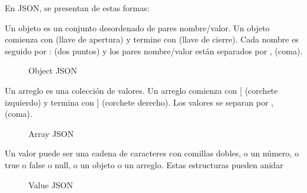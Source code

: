 En JSON, se presentan de estas formas:


Un objeto es un conjunto desordenado de pares nombre/valor. Un objeto comienza con { (llave de apertura) y termine con } (llave de cierre). Cada nombre es seguido por : (dos puntos) y los pares nombre/valor están separados por , (coma).
\begin{figure}[H]
\centering
{}
\caption{Object JSON} \label{fig:objectJSON}
\end{figure}

Un arreglo es una colecci\'on de valores. Un arreglo comienza con [ (corchete izquierdo) y termina con ] (corchete derecho). Los valores se separan por , (coma).

\begin{figure}[H]
\centering
{}
\caption{Array JSON} \label{fig:arrayJSON}
\end{figure}

Un valor puede ser una cadena de caracteres con comillas dobles, o un n\'umero, o true o false o null, o un objeto o un arreglo. Estas estructuras pueden anidar

\begin{figure}[H]
\centering
{}
\caption{Value JSON} \label{fig:valueJSON}
\end{figure}

